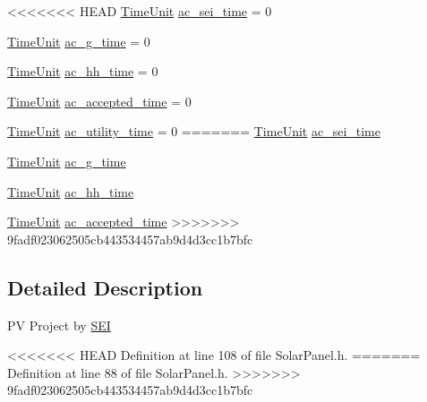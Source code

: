 \begin{DoxyCompactItemize}
\item 
<<<<<<< HEAD
\hyperlink{namespacesolar__core_a4b5949d07259da6f8a20d12a30403e90}{Time\+Unit} \hyperlink{classsolar__core_1_1_p_v_project_a0a78a4b527a897aac39e5572fbb5a842}{ac\+\_\+sei\+\_\+time} = 0
\item 
\hyperlink{namespacesolar__core_a4b5949d07259da6f8a20d12a30403e90}{Time\+Unit} \hyperlink{classsolar__core_1_1_p_v_project_a9be23309024672b4be445f68c73e42a6}{ac\+\_\+g\+\_\+time} = 0
\item 
\hyperlink{namespacesolar__core_a4b5949d07259da6f8a20d12a30403e90}{Time\+Unit} \hyperlink{classsolar__core_1_1_p_v_project_ab6196935ca6f777b28a944642efdbf84}{ac\+\_\+hh\+\_\+time} = 0
\item 
\hyperlink{namespacesolar__core_a4b5949d07259da6f8a20d12a30403e90}{Time\+Unit} \hyperlink{classsolar__core_1_1_p_v_project_a1affdb487e749b689fe2bcbd9c79613c}{ac\+\_\+accepted\+\_\+time} = 0
\item 
\hyperlink{namespacesolar__core_a4b5949d07259da6f8a20d12a30403e90}{Time\+Unit} \hyperlink{classsolar__core_1_1_p_v_project_a7a44008469a8db9a47038e2945a5d723}{ac\+\_\+utility\+\_\+time} = 0
=======
\hyperlink{namespacesolar__core_a4b5949d07259da6f8a20d12a30403e90}{Time\+Unit} \hyperlink{classsolar__core_1_1_p_v_project_a0a78a4b527a897aac39e5572fbb5a842}{ac\+\_\+sei\+\_\+time}
\item 
\hyperlink{namespacesolar__core_a4b5949d07259da6f8a20d12a30403e90}{Time\+Unit} \hyperlink{classsolar__core_1_1_p_v_project_a9be23309024672b4be445f68c73e42a6}{ac\+\_\+g\+\_\+time}
\item 
\hyperlink{namespacesolar__core_a4b5949d07259da6f8a20d12a30403e90}{Time\+Unit} \hyperlink{classsolar__core_1_1_p_v_project_ab6196935ca6f777b28a944642efdbf84}{ac\+\_\+hh\+\_\+time}
\item 
\hyperlink{namespacesolar__core_a4b5949d07259da6f8a20d12a30403e90}{Time\+Unit} \hyperlink{classsolar__core_1_1_p_v_project_a1affdb487e749b689fe2bcbd9c79613c}{ac\+\_\+accepted\+\_\+time}
>>>>>>> 9fadf023062505cb443534457ab9d4d3cc1b7bfc
\end{DoxyCompactItemize}


\subsection{Detailed Description}
P\+V Project by \hyperlink{classsolar__core_1_1_s_e_i}{S\+E\+I} 

<<<<<<< HEAD
Definition at line 108 of file Solar\+Panel.\+h.
=======
Definition at line 88 of file Solar\+Panel.\+h.
>>>>>>> 9fadf023062505cb443534457ab9d4d3cc1b7bfc




